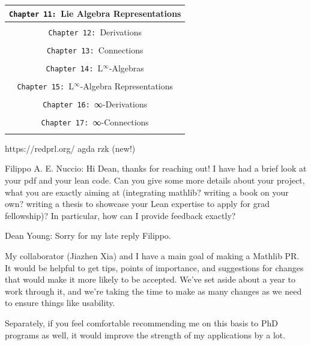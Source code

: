 \documentclass{book}
\theoremstyle{definition}
\begin{document}
{\begin{longtable}{|| l || l ||}
\hline \hline
\multicolumn{2}{||c||}{\texttt{Chapter 11: }Lie Algebra Representations} \\
\hline \hline
 &  \\
\hline \hline
\multicolumn{2}{||c||}{\texttt{Chapter 12: }Derivations} \\
\hline \hline
 &  \\
\hline \hline
\multicolumn{2}{||c||}{\texttt{Chapter 13: }Connections} \\
\hline \hline
 &  \\
\hline \hline
\multicolumn{2}{||c||}{\texttt{Chapter 14: }L${}^{\infty}$-Algebras} \\
\hline \hline
 &  \\
\hline \hline
\multicolumn{2}{||c||}{\texttt{Chapter 15: }L${}^{\infty}$-Algebra Representations} \\
\hline \hline
 &  \\
\hline \hline
\multicolumn{2}{||c||}{\texttt{Chapter 16: }∞-Derivations} \\
\hline \hline
 &  \\
\hline \hline
\multicolumn{2}{||c||}{\texttt{Chapter 17: }∞-Connections} \\
\hline \hline
 &  \\
\hline \hline
\end{longtable}
}



\iffalse
https://redprl.org/
agda
rzk (new!)

Filippo A. E. Nuccio: Hi Dean, thanks for reaching out! I have had a brief look at your pdf and your lean code. Can you give some more details about your project, what you are exactly aiming at (integrating mathlib? writing a book on your own? writing a thesis to showcase your Lean expertise to apply for grad fellowship)? In particular, how can I provide feedback exactly?

Dean Young: Sorry for my late reply Filippo.

My collaborator (Jiazhen Xia) and I have a main goal of making a Mathlib PR. It would be helpful to get tips, points of importance, and suggestions for changes that would make it more likely to be accepted. We've set aside about a year to work through it, and we're taking the time to make as many changes as we need to ensure things like usability.

Separately, if you feel comfortable recommending me on this basis to PhD programs as well, it would improve the strength of my applications by a lot.
\end{document}
